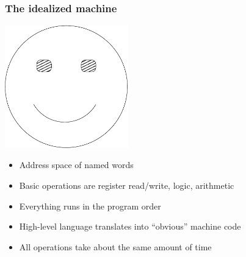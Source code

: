 \documentclass{beamer}
\begin{document}
\begin{frame}
  \frametitle{The idealized machine}
  
  \begin{center}
    \includegraphics[width=0.4\textwidth]{smiley.pdf}
  \end{center}

  \begin{itemize}
  \item Address space of named words
  \item Basic operations are register read/write, logic, arithmetic
  \item Everything runs in the program order
  \item High-level language translates into ``obvious'' machine code
  \item All operations take about the same amount of time
  \end{itemize}
\end{frame}
\end{document}
